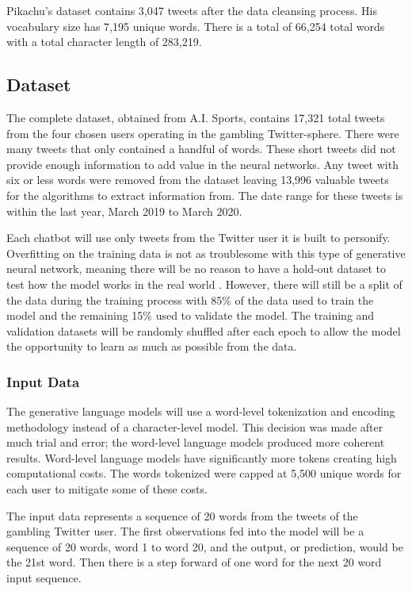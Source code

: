 \documentclass[5p,authoryear]{elsarticle}
\begin{document}
Pikachu’s dataset contains 3,047 tweets after the data cleansing process. His vocabulary size has 7,195 unique words. There is a total of 66,254 total words with a total character length of 283,219. 


\subsection{Dataset}

The complete dataset, obtained from A.I. Sports, contains 17,321 total tweets from the four chosen users operating in the gambling Twitter-sphere. There were many tweets that only contained a handful of words. These short tweets did not provide enough information to add value in the neural networks. Any tweet with six or less words were removed from the dataset leaving 13,996 valuable tweets for the algorithms to extract information from. The date range for these tweets is within the last year, March 2019 to March 2020.

Each chatbot will use only tweets from the Twitter user it is built to personify. Overfitting on the training data is not as troublesome with this type of generative neural network, meaning there will be no reason to have a hold-out dataset to test how the model works in the real world \citep{foster}. However, there will still be a split of the data during the training process with 85\% of the data used to train the model and the remaining 15\% used to validate the model. The training and validation datasets will be randomly shuffled after each epoch to allow the model the opportunity to learn as much as possible from the data. 



\subsubsection{Input Data}

The generative language models will use a word-level tokenization and encoding methodology instead of a character-level model. This decision was made after much trial and error; the word-level language models produced more coherent results. Word-level language models have significantly more tokens creating high computational costs. The words tokenized were capped at 5,500 unique words for each user to mitigate some of these costs. 

The input data represents a sequence of 20 words from the tweets of the gambling Twitter user. The first observations fed into the model will be a sequence of 20 words, word 1 to word 20, and the output, or prediction, would be the 21st word. Then there is a step forward of one word for the next 20 word input sequence.
\end{document}
